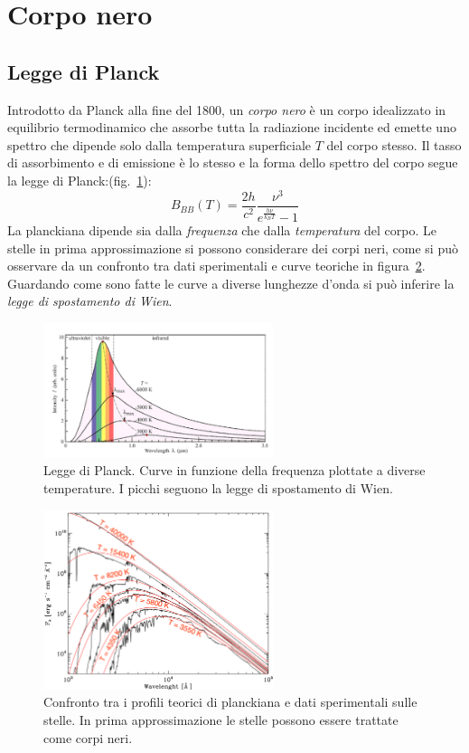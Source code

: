 \section{Corpo nero}\label{sec:corpo-nero}

\subsection{Legge di Planck}\label{sec:legge-planck}
Introdotto da Planck alla fine del 1800, un \emph{corpo nero} è un corpo idealizzato in equilibrio termodinamico che assorbe tutta la radiazione incidente ed emette uno spettro che dipende solo dalla temperatura superficiale $T$ del corpo stesso. Il tasso di assorbimento e di emissione è lo stesso e la forma dello spettro del corpo segue la legge di Planck:(fig.~\ref{fig:corpo-nero}):
\begin{equation}\label{eq:corpo-nero}
    B_{BB} (T) = \frac{2 h}{c^2} \frac{\nu^3}{e^{\frac{h \nu}{k_B T}} - 1}
\end{equation}
La planckiana dipende sia dalla \emph{frequenza} che dalla \emph{temperatura} del corpo. Le stelle in prima approssimazione si possono considerare dei corpi neri, come si può osservare da un confronto tra dati sperimentali e curve teoriche in figura~\ref{fig:stelle-corpi-neri}. Guardando come sono fatte le curve a diverse lunghezze d'onda si può inferire la \emph{legge di spostamento di Wien}.

\begin{figure}
\centering
\includegraphics[width=0.6\textwidth]{immagini/corpo-nero.png}
\caption{Legge di Planck. Curve in funzione della frequenza plottate a diverse temperature. I picchi seguono la legge di spostamento di Wien.}
\label{fig:corpo-nero}
\end{figure}

\begin{figure}
\centering
\includegraphics[width=0.6\textwidth]{immagini/stelle-corpi-neri.png}
\caption{Confronto tra i profili teorici di planckiana e dati sperimentali sulle stelle. In prima approssimazione le stelle possono essere trattate come corpi neri.}
\label{fig:stelle-corpi-neri}
\end{figure}

